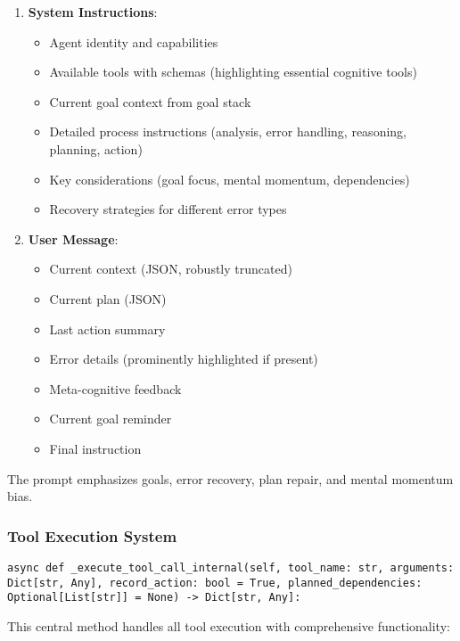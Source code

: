 \documentclass[12pt,a4paper]{article}
\begin{document}
\begin{enumerate}[label=\arabic*.]
    \item \textbf{System Instructions}:
    \begin{itemize}
        \item Agent identity and capabilities
        \item Available tools with schemas (highlighting essential cognitive tools)
        \item Current goal context from goal stack
        \item Detailed process instructions (analysis, error handling, reasoning, planning, action)
        \item Key considerations (goal focus, mental momentum, dependencies)
        \item Recovery strategies for different error types
    \end{itemize}
    \item \textbf{User Message}:
    \begin{itemize}
        \item Current context (JSON, robustly truncated)
        \item Current plan (JSON)
        \item Last action summary
        \item Error details (prominently highlighted if present)
        \item Meta-cognitive feedback
        \item Current goal reminder
        \item Final instruction
    \end{itemize}
\end{enumerate}

The prompt emphasizes goals, error recovery, plan repair, and mental momentum bias.

\subsubsection*{Tool Execution System}
\begin{pageablecode}
\begin{verbatim}
async def _execute_tool_call_internal(self, tool_name: str, arguments: Dict[str, Any], record_action: bool = True, planned_dependencies: Optional[List[str]] = None) -> Dict[str, Any]:
\end{verbatim}
\end{pageablecode}
This central method handles all tool execution with comprehensive functionality:
\end{document}
